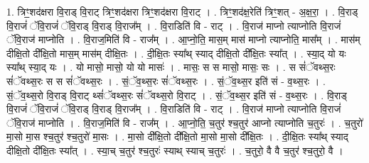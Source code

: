 \documentclass[17pt]{extarticle}
\begin{document}
1. त्रिꣳ॒॒शद॑क्षरा वि॒राड् वि॒राट् त्रिꣳ॒॒शद॑क्षरा त्रिꣳ॒॒शद॑क्षरा वि॒राट् । . त्रिꣳ॒॒शद॑क्ष॒रेति॑ त्रिꣳ॒॒शत् - अ॒क्ष॒रा॒ । . वि॒राड् वि॒राजं॑ ॅवि॒राजं॑ ॅवि॒राड् वि॒राड् वि॒राज᳚म् । . वि॒राडिति॑ वि - राट् । . वि॒राज॑ माप्नो त्याप्नोति वि॒राजं॑ ॅवि॒राज॑ माप्नोति । . वि॒राज॒मिति॑ वि - राज᳚म् । . आ॒प्नो॒ति॒ मास॒म् मास॑ माप्नो त्याप्नोति॒ मास᳚म् । . मास॑म् दीक्षि॒तो दी᳚क्षि॒तो मास॒म् मास॑म् दीक्षि॒तः । . दी॒क्षि॒तः स्या᳚थ् स्याद् दीक्षि॒तो दी᳚क्षि॒तः स्या᳚त् । . स्या॒द् यो यः स्या᳚थ् स्या॒द् यः । . यो मासो॒ मासो॒ यो यो मासः॑ । . मासः॒ स स मासो॒ मासः॒ सः । . स सं॑ॅवथ्स॒रः सं॑ॅवथ्स॒रः स स सं॑ॅवथ्स॒रः । . सं॒ॅव॒थ्स॒रः सं॑ॅवथ्स॒रः । . सं॒ॅव॒थ्स॒र इति॑ सं - व॒थ्स॒रः । . सं॒ॅव॒थ्स॒रो वि॒राड् वि॒राट् थ्सं॑ॅवथ्स॒रः सं॑ॅवथ्स॒रो वि॒राट् । . सं॒ॅव॒थ्स॒र इति॑ सं - व॒थ्स॒रः । . वि॒राड् वि॒राजं॑ ॅवि॒राजं॑ ॅवि॒राड् वि॒राड् वि॒राज᳚म् । . वि॒राडिति॑ वि - राट् । . वि॒राज॑ माप्नो त्याप्नोति वि॒राजं॑ ॅवि॒राज॑ माप्नोति । . वि॒राज॒मिति॑ वि - राज᳚म् । . आ॒प्नो॒ति॒ च॒तुर॑ श्च॒तुर॑ आप्नो त्याप्नोति च॒तुरः॑ । . च॒तुरो॑ मा॒सो मा॒स श्च॒तुर॑ श्च॒तुरो॑ मा॒सः । . मा॒सो दी᳚क्षि॒तो दी᳚क्षि॒तो मा॒सो मा॒सो दी᳚क्षि॒तः । . दी॒क्षि॒तः स्या᳚थ् स्याद् दीक्षि॒तो दी᳚क्षि॒तः स्या᳚त् । . स्या॒च् च॒तुर॑ श्च॒तुरः॑ स्याथ् स्याच् च॒तुरः॑ । . च॒तुरो॒ वै वै च॒तुर॑ श्च॒तुरो॒ वै । \newline
\end{document}
